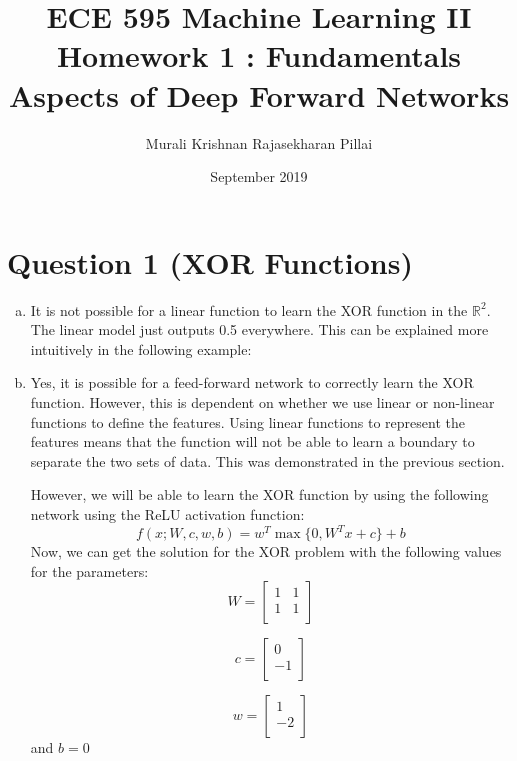 \documentclass[fleqn]{article}
\title{
  ECE 595 Machine Learning II \\
  \large Homework 1 : Fundamentals Aspects of Deep Forward Networks}
\author{Murali Krishnan Rajasekharan Pillai}
\date{September 2019}
\DeclareMathOperator*{\argmax}{max}
\begin{document}
\maketitle

\section*{Question 1 (XOR Functions)}
\begin{enumerate}[a)]
    \item 
    It is not possible for a linear function to learn the XOR function in the \(\mathbb{R}^2\). The linear model just
    outputs 0.5 everywhere. This can be explained more intuitively in the following example:
    
    \vspace{50 mm}
    
    
    \item
    Yes, it is possible for a feed-forward network to correctly learn the XOR function. However, this is dependent 
    on whether we use linear or non-linear functions to define the features. Using linear functions to represent the 
    features means that the function will not be able to learn a boundary to separate the two sets of data. This 
    was demonstrated in the previous section.
    
    However, we will be able to learn the XOR function by using the following network using the ReLU activation 
    function:
    \begin{equation*}
    f(x; W, c, w, b) = w^T \argmax \{0, W^Tx + c\} + b
    \end{equation*}
    Now, we can get the solution for the XOR problem with the following values for the parameters:
    $$W = \begin{bmatrix}
    1 & 1 \\
    1 & 1\\
    \end{bmatrix}$$
    
    $$c = \begin{bmatrix}
    0 \\
    -1 \\
    \end{bmatrix}$$
    
    $$w = \begin{bmatrix}
    1 \\
    -2 \\
    \end{bmatrix}$$
    and $b = 0$
    

\end{enumerate}
\end{document}
